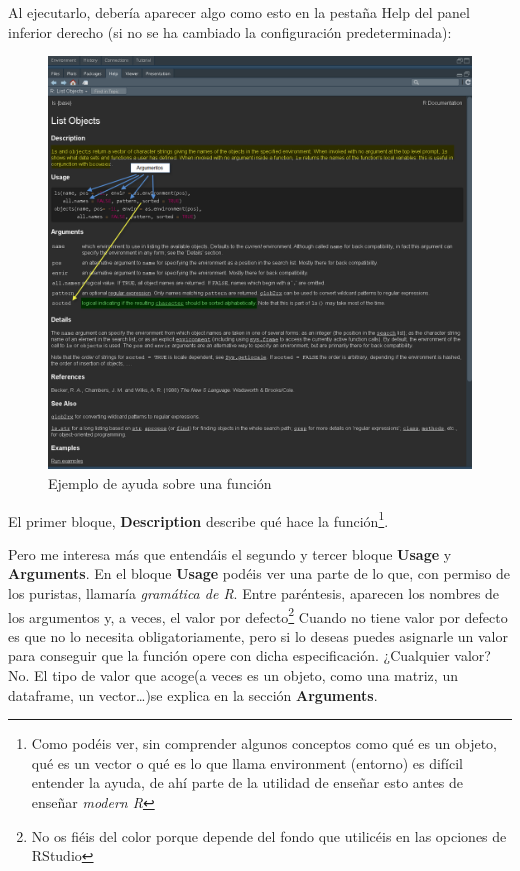 \documentclass[
  letterpaper,
  DIV=11,
  numbers=noendperiod]{scrreprt}
\begin{document}
Al ejecutarlo, debería aparecer algo como esto en la pestaña Help del
panel inferior derecho (si no se ha cambiado la configuración
predeterminada):

\begin{figure}

{\centering \includegraphics{./pics/ejemplo_ayuda_ls.png}

}

\caption{Ejemplo de ayuda sobre una función}

\end{figure}

El primer bloque, \textbf{Description} describe qué hace la
función\footnote{Como podéis ver, sin comprender algunos conceptos como
  qué es un objeto, qué es un vector o qué es lo que llama environment
  (entorno) es difícil entender la ayuda, de ahí parte de la utilidad de
  enseñar esto antes de enseñar \emph{modern R}}.

Pero me interesa más que entendáis el segundo y tercer bloque
\textbf{Usage} y \textbf{Arguments}. En el bloque \textbf{Usage} podéis
ver una parte de lo que, con permiso de los puristas, llamaría
\emph{gramática de R}. Entre paréntesis, aparecen los nombres de los
argumentos y, a veces, el valor por defecto\footnote{No os fiéis del
  color porque depende del fondo que utilicéis en las opciones de
  RStudio} Cuando no tiene valor por defecto es que no lo necesita
obligatoriamente, pero si lo deseas puedes asignarle un valor para
conseguir que la función opere con dicha especificación. ¿Cualquier
valor? No. El tipo de valor que acoge(a veces es un objeto, como una
matriz, un dataframe, un vector\ldots)se explica en la sección
\textbf{Arguments}.
\end{document}
